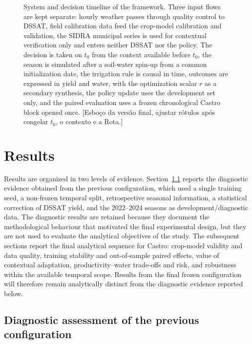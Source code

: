 \documentclass[times,final,authoryear]{elsarticle}
\begin{document}
\begin{figure}[!h]
{}
\caption{System and decision timeline of the framework. Three input flows are kept separate: hourly weather passes through quality control to DSSAT, field calibration data feed the crop-model calibration and validation, the SIDRA municipal series is used for contextual verification only and enters neither DSSAT nor the policy. The decision is taken on $t_0$ from the context available before $t_0$, the season is simulated after a soil-water spin-up from a common initialization date, the irrigation rule is causal in time, outcomes are expressed in yield and water, with the optimization scalar $r$ as a secondary synthesis, the policy update uses the development set only, and the paired evaluation uses a frozen chronological Castro block opened once. [Esboço da versão final, ajustar rótulos após congelar $t_0$, o contexto e a Rota.]}
\label{fig:flowchart_dssat_ppo}
\end{figure}


\section{Results}
\label{resultados}

Results are organized in two levels of evidence. Section~\ref{subres_diagnostic} reports the diagnostic evidence obtained from the previous configuration, which used a single training seed, a non-frozen temporal split, retrospective seasonal information, a statistical correction of DSSAT yield, and the 2022--2024 seasons as development/diagnostic data. The diagnostic results are retained because they document the methodological behaviour that motivated the final experimental design, but they are not used to evaluate the analytical objectives of the study. The subsequent sections report the final analytical sequence for Castro: crop-model validity and data quality, training stability and out-of-sample paired effects, value of contextual adaptation, productivity--water trade-offs and risk, and robustness within the available temporal scope. Results from the final frozen configuration will therefore remain analytically distinct from the diagnostic evidence reported below.

\subsection{Diagnostic assessment of the previous configuration}
\label{subres_diagnostic}
\end{document}
